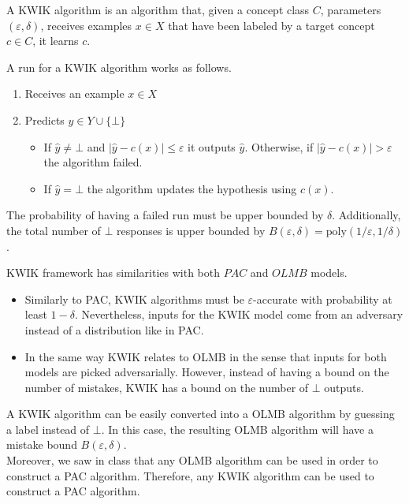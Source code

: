 A KWIK algorithm is an algorithm that, given a concept class $C$, parameters $(\varepsilon, \delta)$,  receives examples $x \in X$ that have been labeled by a target concept $c \in C$, it learns $c$.

A run for a KWIK algorithm works as follows.
\begin{enumerate}
  \item Receives an example $x \in X$
  \item Predicts $\hat{y} \in Y \cup \{\bot\}$
    \begin{itemize}
      \item If $\hat{y} \neq \bot$ and $|\hat{y} - c(x)| \leq \varepsilon$ it outputs $\hat{y}$. Otherwise, if $|\hat{y} - c(x)| > \varepsilon$ the algorithm failed.
      \item If $\hat{y} = \bot$ the algorithm updates the hypothesis using $c(x)$.
    \end{itemize}
\end{enumerate}

The probability of having a failed run must be upper bounded by $\delta$. Additionally, the total number of $\bot$ responses is upper bounded by $B(\varepsilon,\delta)=\text{poly}(1/\varepsilon,1/\delta)$.

KWIK framework has similarities with both $PAC$ and $OLMB$ models.
\begin{itemize}
  \item Similarly to PAC, KWIK algorithms must be $\varepsilon$-accurate with probability at least $1-\delta$. Nevertheless, inputs for the KWIK model come from an adversary instead of a distribution like in PAC.
  \item In the same way KWIK relates to OLMB in the sense that inputs for both models are picked adversarially. However, instead of having a bound on the number of mistakes, KWIK has a bound on the number of $\bot$ outputs.
\end{itemize}

A KWIK algorithm can be easily converted into a OLMB algorithm by guessing a label instead of $\bot$. In this case, the resulting OLMB algorithm will have a mistake bound $B(\varepsilon,\delta)$.\\

Moreover, we saw in class that any OLMB algorithm can be used in order to construct a PAC algorithm. Therefore, any KWIK algorithm can be used to construct a PAC algorithm.

